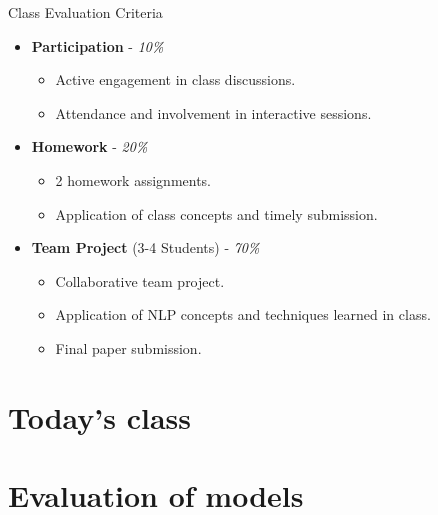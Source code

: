 \documentclass{beamer}
\begin{document}
\begin{frame}{Class Evaluation Criteria}

\begin{itemize}
  \item \textbf{Participation} - \textit{10\%}
    \begin{itemize}
      \item Active engagement in class discussions.
      \item Attendance and involvement in interactive sessions.
    \end{itemize}

  \item \textbf{Homework} - \textit{20\%}
    \begin{itemize}
      \item 2 homework assignments.
      \item Application of class concepts and timely submission.
    \end{itemize}

  \item \textbf{Team Project} (3-4 Students) - \textit{70\%}
    \begin{itemize}
      \item Collaborative team project.
      \item Application of NLP concepts and techniques learned in class.
      \item Final paper submission.
    \end{itemize}
\end{itemize}

\end{frame}

\section{Today's class}

\section{Evaluation of models}
\end{document}
